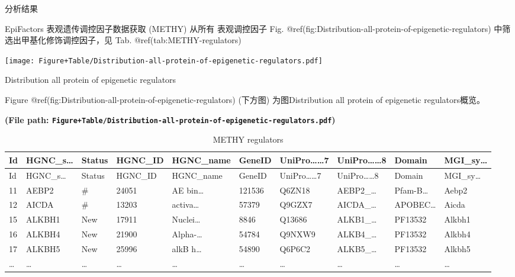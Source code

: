 \documentclass[
  ignorenonframetext,
]{beamer}
\begin{document}
\begin{frame}[fragile]{分析结果}
\protect\hypertarget{workflow}{}
\begin{block}{EpiFactors 表观遗传调控因子数据获取 (METHY)}
\protect\hypertarget{epifactors-ux8868ux89c2ux9057ux4f20ux8c03ux63a7ux56e0ux5b50ux6570ux636eux83b7ux53d6-methy}{}
从所有 表观调控因子 Fig.
@ref(fig:Distribution-all-protein-of-epigenetic-regulators)
中筛选出甲基化修饰调控因子，见 Tab. @ref(tab:METHY-regulators)

\begin{center}\vspace{1.5cm}\end{center}
\def\@captype{figure}
\begin{center}
\texttt{[image: Figure+Table/Distribution-all-protein-of-epigenetic-regulators.pdf]}
\caption{Distribution all protein of epigenetic regulators}\label{fig:Distribution-all-protein-of-epigenetic-regulators}
\end{center}

Figure @ref(fig:Distribution-all-protein-of-epigenetic-regulators)
(下方图) 为图Distribution all protein of epigenetic regulators概览。

\textbf{(File path:
\texttt{Figure+Table/Distribution-all-protein-of-epigenetic-regulators.pdf})}

\begin{center}\vspace{1.5cm}\end{center}

\begin{center}\vspace{1.5cm}\end{center}

\begin{longtable}[]{@{}llllllllll@{}}
\caption{METHY regulators}\tabularnewline
\toprule
Id & HGNC\_s\ldots{} & Status & HGNC\_ID & HGNC\_name & GeneID &
UniPro\ldots\ldots7 & UniPro\ldots\ldots8 & Domain &
MGI\_sy\ldots{}\tabularnewline
\midrule
\endfirsthead
\toprule
Id & HGNC\_s\ldots{} & Status & HGNC\_ID & HGNC\_name & GeneID &
UniPro\ldots\ldots7 & UniPro\ldots\ldots8 & Domain &
MGI\_sy\ldots{}\tabularnewline
\midrule
\endhead
11 & AEBP2 & \# & 24051 & AE bin\ldots{} & 121536 & Q6ZN18 &
AEBP2\_\ldots{} & Pfam-B\ldots{} & Aebp2\tabularnewline
12 & AICDA & \# & 13203 & activa\ldots{} & 57379 & Q9GZX7 &
AICDA\_\ldots{} & APOBEC\ldots{} & Aicda\tabularnewline
15 & ALKBH1 & New & 17911 & Nuclei\ldots{} & 8846 & Q13686 &
ALKB1\_\ldots{} & PF13532 & Alkbh1\tabularnewline
16 & ALKBH4 & New & 21900 & Alpha-\ldots{} & 54784 & Q9NXW9 &
ALKB4\_\ldots{} & PF13532 & Alkbh4\tabularnewline
17 & ALKBH5 & New & 25996 & alkB h\ldots{} & 54890 & Q6P6C2 &
ALKB5\_\ldots{} & PF13532 & Alkbh5\tabularnewline
\ldots{} & \ldots{} & \ldots{} & \ldots{} & \ldots{} & \ldots{} &
\ldots{} & \ldots{} & \ldots{} & \ldots{}\tabularnewline
\bottomrule
\end{longtable}


\end{block}
\end{frame}
\end{document}
